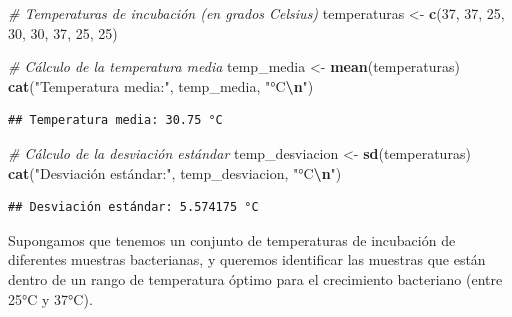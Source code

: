\documentclass[
]{book}
\newenvironment{Shaded}{\begin{snugshade}}{\end{snugshade}}
\newcommand{\CommentTok}[1]{\textcolor[rgb]{0.56,0.35,0.01}{\textit{#1}}}
\newcommand{\DecValTok}[1]{\textcolor[rgb]{0.00,0.00,0.81}{#1}}
\newcommand{\FunctionTok}[1]{\textcolor[rgb]{0.13,0.29,0.53}{\textbf{#1}}}
\newcommand{\NormalTok}[1]{#1}
\newcommand{\OtherTok}[1]{\textcolor[rgb]{0.56,0.35,0.01}{#1}}
\newcommand{\SpecialCharTok}[1]{\textcolor[rgb]{0.81,0.36,0.00}{\textbf{#1}}}
\newcommand{\StringTok}[1]{\textcolor[rgb]{0.31,0.60,0.02}{#1}}
\begin{document}
\begin{Shaded}
\begin{Highlighting}[]
\CommentTok{\# Temperaturas de incubación (en grados Celsius)}
\NormalTok{temperaturas }\OtherTok{\textless{}{-}} \FunctionTok{c}\NormalTok{(}\DecValTok{37}\NormalTok{, }\DecValTok{37}\NormalTok{, }\DecValTok{25}\NormalTok{, }\DecValTok{30}\NormalTok{, }\DecValTok{30}\NormalTok{, }\DecValTok{37}\NormalTok{, }\DecValTok{25}\NormalTok{, }\DecValTok{25}\NormalTok{)}

\CommentTok{\# Cálculo de la temperatura media}
\NormalTok{temp\_media }\OtherTok{\textless{}{-}} \FunctionTok{mean}\NormalTok{(temperaturas)}
\FunctionTok{cat}\NormalTok{(}\StringTok{"Temperatura media:"}\NormalTok{, temp\_media, }\StringTok{"°C}\SpecialCharTok{\textbackslash{}n}\StringTok{"}\NormalTok{)}
\end{Highlighting}
\end{Shaded}

\begin{verbatim}
## Temperatura media: 30.75 °C
\end{verbatim}

\begin{Shaded}
\begin{Highlighting}[]
\CommentTok{\# Cálculo de la desviación estándar}
\NormalTok{temp\_desviacion }\OtherTok{\textless{}{-}} \FunctionTok{sd}\NormalTok{(temperaturas)}
\FunctionTok{cat}\NormalTok{(}\StringTok{"Desviación estándar:"}\NormalTok{, temp\_desviacion, }\StringTok{"°C}\SpecialCharTok{\textbackslash{}n}\StringTok{"}\NormalTok{)}
\end{Highlighting}
\end{Shaded}

\begin{verbatim}
## Desviación estándar: 5.574175 °C
\end{verbatim}

Supongamos que tenemos un conjunto de temperaturas de incubación de diferentes muestras bacterianas, y queremos identificar las muestras que están dentro de un rango de temperatura óptimo para el crecimiento bacteriano (entre 25°C y 37°C).
\end{document}
